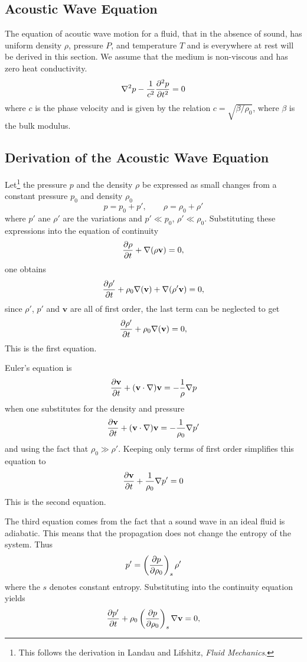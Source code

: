 \documentclass{article}
\begin{document}
\subsection{Acoustic Wave Equation}

The equation of acoutic wave motion for a fluid, that in the absence of sound,
has uniform density $\rho$, pressure $P$, and temperature $T$ and is everywhere
at rest will be derived in this section.  We assume that the medium is non-viscous
and has zero heat conductivity.  
$$
\nabla^2p-\frac{1}{c^2} {\partial^2 p \over \partial t^2} = 0
\label{eqn:lineareuler}
$$
where $c$ is the phase velocity and is given by the relation $c= \sqrt{\beta/\rho_0}$, where $\beta$ is the
bulk modulus.

\subsection{Derivation of the Acoustic Wave Equation}

Let\footnote{This follows the derivation in Landau and Lifshitz, \textit{Fluid Mechanics}.}
the pressure $p$ and the density $\rho$ be expressed as small changes
from a constant pressure $p_0$ and density $\rho_0$
$$
p = p_0 + p', \qquad \rho = \rho_0 + \rho'
$$
where $p'$ ane $\rho'$ are the variations and $p'\ll p_0$, $\rho'\ll\rho_0$.
Substituting these expressions into the equation of continuity
$$
{\partial \rho\over\partial t} + \nabla(\rho \mathbf{v}) = 0,
$$
one obtains
$$
{\partial \rho'\over\partial t} + \rho_0\nabla(\mathbf{v}) + \nabla(\rho'\mathbf{v}) = 0,
$$
since $\rho'$, $p'$ and $\mathbf{v}$ are all of first order, the last term can
be neglected to get
$$
{\partial \rho'\over\partial t} + \rho_0\nabla(\mathbf{v}) = 0,
$$
This is the first equation.

Euler's equation is
$$
{\partial\mathbf{v}\over\partial t} + (\mathbf{v} \cdot \nabla)\mathbf{v} = -{1\over\rho} \nabla p
$$
when one substitutes for the density and pressure
$$
{\partial\mathbf{v}\over\partial t} + (\mathbf{v} \cdot \nabla)\mathbf{v} = -{1\over\rho_0} \nabla p'
$$
and using the fact that $\rho_0\gg\rho'$.  Keeping only terms of first order
simplifies this equation to
$$
{\partial\mathbf{v}\over\partial t} + {1\over\rho_0} \nabla p'=0
$$
This is the second equation.

The third equation comes from the fact that a sound wave in an ideal
fluid is adiabatic.  This means that the propagation does not change
the entropy of the system.  Thus
$$
p' = \left({\partial p \over \partial \rho_0}\right)_s  \rho'
$$
where the $s$ denotes constant entropy.  Substituting into the continuity equation yields
$$
{\partial p'\over\partial t} + \rho_0\left({\partial p\over \partial \rho_0}\right)_s\nabla\mathbf{v} = 0,
$$
\end{document}
